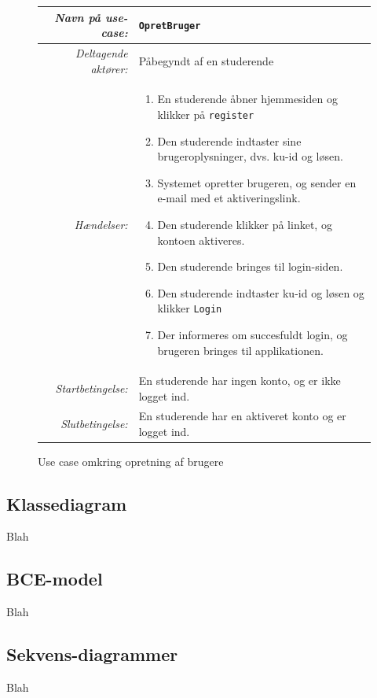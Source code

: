 \documentclass[12pt]{article}
\begin{document}
\begin{figure}[htpb]
    \centering
    \begin{tabular}{r p{10cm}}
        \toprule
        \textit{Navn på use-case:} & \verb!OpretBruger! \\
        \hline
        \textit{Deltagende aktører:} & Påbegyndt af en studerende \\
        \hline
        \textit{Hændelser:} & \begin{enumerate}[nolistsep]
            \item En studerende åbner hjemmesiden og klikker på \verb!register!
            \item Den studerende indtaster sine brugeroplysninger, dvs. ku-id og løsen.
            \item Systemet opretter brugeren, og sender en e-mail med et aktiveringslink.
            \item Den studerende klikker på linket, og kontoen aktiveres.
            \item Den studerende bringes til login-siden.
            \item Den studerende indtaster ku-id og løsen og klikker \verb!Login!
            \item Der informeres om succesfuldt login, og brugeren bringes til applikationen.
        \end{enumerate}  \\
        \hline
        \textit{Startbetingelse:} & En studerende har ingen konto, og er ikke logget ind. \\
        \hline
        \textit{Slutbetingelse:} & En studerende har en aktiveret konto og er logget ind. \\
        \bottomrule
    \end{tabular}
    \caption{Use case omkring opretning af brugere}
    \label{fig:use_case1}
\end{figure}

\subsection{Klassediagram}
Blah

\subsection{BCE-model}
Blah

\subsection{Sekvens-diagrammer}
Blah
\end{document}
